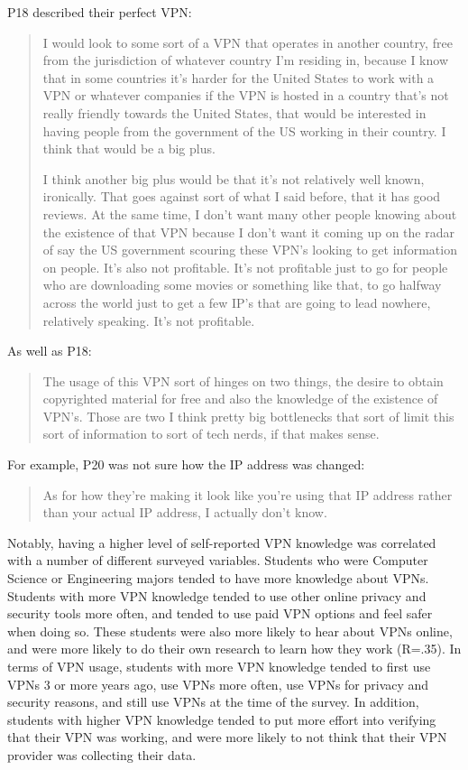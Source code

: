 P18 described their perfect VPN: \begin{quote}I would look to some sort of a
    VPN that operates in another country, free from the jurisdiction of
    whatever country I'm residing in, because I know that in some countries
    it's harder for the United States to work with a VPN or whatever companies
    if the VPN is hosted in a country that's not really friendly towards the
    United States, that would be interested in having people from the
    government of the US working in their country. I think that would be a big
    plus.


I think another big plus would be that it's not relatively well known,
ironically. That goes against sort of what I said before, that it has good
reviews. At the same time, I don't want many other people knowing about the
existence of that VPN because I don't want it coming up on the radar of say
the US government scouring these VPN's looking to get information on people.
It's also not profitable. It's not profitable just to go for people who are
downloading some movies or something like that, to go halfway across the world
just to get a few IP's that are going to lead nowhere, relatively speaking.
It's not profitable.\end{quote}



As well as P18: \begin{quote}The usage of this VPN sort of hinges on two
things, the desire to obtain copyrighted material for free and also the
knowledge of the existence of VPN's. Those are two I think pretty big
bottlenecks that sort of limit this sort of information to sort of tech nerds,
if that makes sense.\end{quote}

For example, P20 was not sure how the IP address was changed: \begin{quote} As for how they're making it look like you're using that IP
address rather than your actual IP address, I actually don't know.\end{quote}

Notably, having a higher level of self-reported VPN knowledge was correlated
with a number of different surveyed variables. Students who were Computer
Science or Engineering majors tended to have more knowledge about VPNs.
Students with more VPN knowledge tended to use other online privacy and
security tools more often, and tended to use paid VPN options and feel safer
when doing so. These students were also more likely to hear about VPNs online,
and were more likely to do their own research to learn how they work (R=.35).
In terms of VPN usage, students with more VPN knowledge tended to first use
VPNs 3 or more years ago, use VPNs more often, use VPNs for privacy and
security reasons, and still use VPNs at the time of the survey. In addition,
students with higher VPN knowledge tended to put more effort into verifying
that their VPN was working, and were more likely to not think that their VPN
provider was collecting their data.

